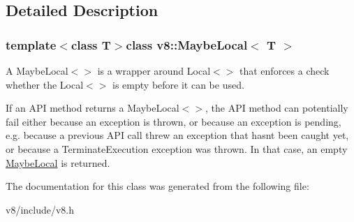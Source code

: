 \subsection{Detailed Description}
\subsubsection*{template$<$class T$>$class v8\+::\+Maybe\+Local$<$ T $>$}

A Maybe\+Local$<$$>$ is a wrapper around Local$<$$>$ that enforces a check whether the Local$<$$>$ is empty before it can be used.

If an A\+P\+I method returns a Maybe\+Local$<$$>$, the A\+P\+I method can potentially fail either because an exception is thrown, or because an exception is pending, e.\+g. because a previous A\+P\+I call threw an exception that hasn\textquotesingle{}t been caught yet, or because a Terminate\+Execution exception was thrown. In that case, an empty \hyperlink{classv8_1_1MaybeLocal}{Maybe\+Local} is returned. 

The documentation for this class was generated from the following file\+:\begin{DoxyCompactItemize}
\item 
v8/include/v8.\+h\end{DoxyCompactItemize}
